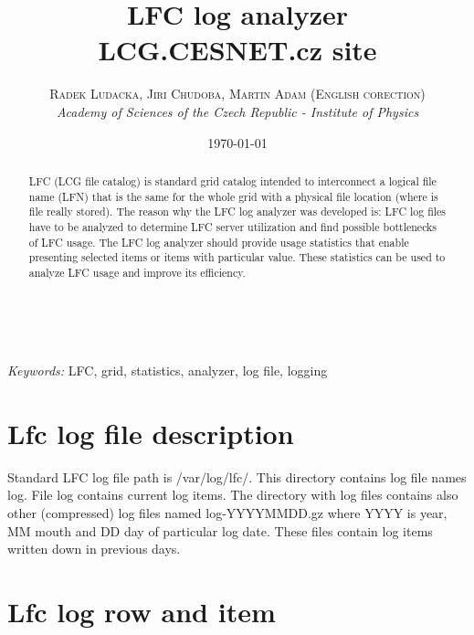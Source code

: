 \documentclass[a4paper, 11pt]{article} %
\title{\textbf{LFC log analyzer}\\ %
LCG.CESNET.cz site} %
\author{\textsc{Radek Ludacka, Jiri Chudoba, Martin Adam (English corection)} %
\\{\textit{Academy of Sciences of the Czech Republic - Institute of Physics}}} %
\date{\today} %
\makeatletter
\renewcommand{\maketitle}{ %
\begin{flushright} %
{\LARGE\@title} %

\vspace{50pt} %

{\large\@author} %
\\\@date %

\vspace{40pt} %
\end{flushright}
}
\makeatother
\begin{document}
\maketitle %



\begin{abstract}
LFC (LCG file catalog) is standard grid catalog intended to interconnect a logical file name (LFN) that is the same for the whole grid with a physical file location (where is file really stored). The reason why the LFC log analyzer was developed is: LFC log files have to be analyzed to determine LFC server utilization and find possible bottlenecks of LFC usage. The LFC log analyzer should provide usage statistics that enable presenting selected items or items with particular value. These statistics can be used to analyze LFC usage and improve its efficiency.
\end{abstract}

\hspace*{3,6mm}\textit{Keywords:} LFC, grid, statistics, analyzer, log file, logging %

\vspace{30pt} %


\section*{Lfc log file description}

Standard LFC log file path is /var/log/lfc/. This directory contains log file names log. File log contains current log items. The directory with log files contains also other (compressed) log files named log-YYYYMMDD.gz where YYYY is year, MM mouth and DD day of particular log date. These files contain log items written down in previous days.

\newpage

\section{Lfc log row and item}
\end{document}
